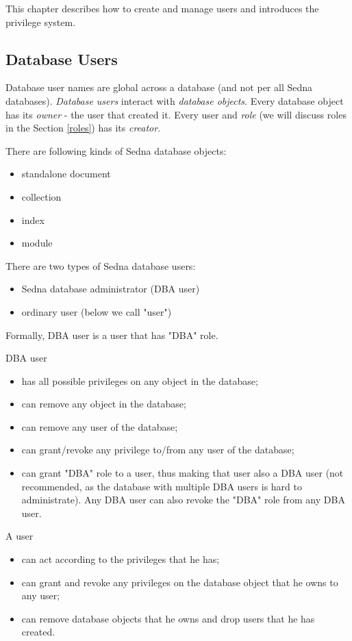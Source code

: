 \documentclass[a4paper,12pt]{article}
\begin{document}
This chapter describes how to create and manage users and introduces the privilege system.

\subsection{Database Users}

Database user names are global across a database (and not per all Sedna databases). \emph{Database users} interact with \emph{database objects}. Every database object has its \emph{owner} - the user that created it. Every user and \emph{role} (we will discuss roles in the Section \ref{roles}) has its \emph{creator}.

There are following kinds of Sedna database objects:
\begin{itemize}
\item standalone document
\item collection
\item index
\item module
\end{itemize}

There are two types of Sedna database users:

\begin{itemize}
\item Sedna database administrator (DBA user)
\item ordinary user (below we call "user")
\end{itemize}

Formally, DBA user is a user that has "DBA" role.

DBA user
\begin{itemize}
\item has all possible privileges on any object in the database;
\item can remove any object in the database;
\item can remove any user of the database;
\item can grant/revoke any privilege to/from any user of the database;
\item can grant "DBA" role to a user, thus making that user also a DBA user (not recommended, as the database with multiple DBA users is hard to administrate). Any DBA user can also revoke the "DBA" role from any DBA user.
\end{itemize}

A user
\begin{itemize}
\item can act according to the privileges that he has;
\item can grant and revoke any privileges on the database object that he owns to any user;
\item can remove database objects that he owns and drop users that he has created. 
\end{itemize}
\end{document}
